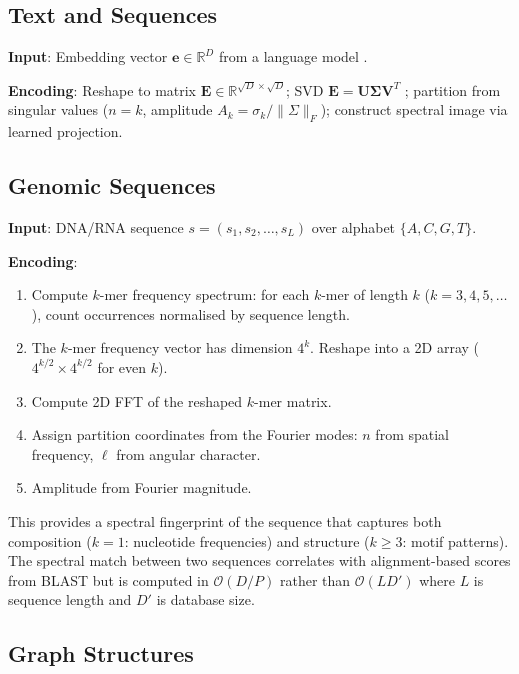 \documentclass[11pt,twocolumn,a4paper]{article}
\newcommand{\BigO}{\mathcal{O}}
\newcommand{\R}{\mathbb{R}}
\begin{document}
\subsection{Text and Sequences}
\label{subsec:enc_text}

\textbf{Input}: Embedding vector $\mathbf{e} \in \R^D$ from a language
model \citep{vaswani2017, reimers2019}.

\textbf{Encoding}: Reshape to matrix
$\mathbf{E} \in \R^{\sqrt{D} \times \sqrt{D}}$; SVD
$\mathbf{E} = \mathbf{U\Sigma V}^T$ \citep{golub1965}; partition from
singular values ($n = k$, amplitude $A_k = \sigma_k / \|\Sigma\|_F$);
construct spectral image via learned projection.

\subsection{Genomic Sequences}
\label{subsec:enc_genomic}

\textbf{Input}: DNA/RNA sequence $s = (s_1, s_2, \ldots, s_L)$ over
alphabet $\{A, C, G, T\}$.

\textbf{Encoding}:
\begin{enumerate}[nosep]
  \item Compute $k$-mer frequency spectrum: for each $k$-mer of length
    $k$ ($k = 3, 4, 5, \ldots$), count occurrences normalised by
    sequence length.
  \item The $k$-mer frequency vector has dimension $4^k$. Reshape into
    a 2D array ($4^{k/2} \times 4^{k/2}$ for even $k$).
  \item Compute 2D FFT of the reshaped $k$-mer matrix.
  \item Assign partition coordinates from the Fourier modes: $n$ from
    spatial frequency, $\ell$ from angular character.
  \item Amplitude from Fourier magnitude.
\end{enumerate}
This provides a spectral fingerprint of the sequence that captures
both composition ($k=1$: nucleotide frequencies) and structure
($k \geq 3$: motif patterns). The spectral match between two sequences
correlates with alignment-based scores from BLAST \citep{altschul1990}
but is computed in $\BigO(D/P)$ rather than $\BigO(LD')$ where $L$ is
sequence length and $D'$ is database size.

\subsection{Graph Structures}
\label{subsec:enc_graph}
\end{document}
